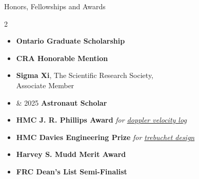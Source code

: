 \documentclass[]{mcdowellcv}
\begin{document}
\begin{cvsection}{Honors, Fellowships and Awards}
	\begin{cvsubsection}{}{}{}
		\vspace*{-1em}
		\begin{multicols}{2}
			\begin{itemize}
				\item[2026] \textbf{Ontario Graduate Scholarship}
				\item[2026] \textbf{CRA Honorable Mention}
				\item[2026] \textbf{Sigma Xi}, The Scientific Research Society,\\ Associate Member
				\item[2024] \hspace{-0.5em} \& 2025 \textbf{Astronaut Scholar}
				\item[2024] \textbf{HMC J. R. Phillips Award} \textit{for \hyperlink{doppler_velocity_log}{doppler velocity log}}
				\item[2023] \textbf{HMC Davies Engineering Prize} \textit{for \hyperlink{trebuchet_design}{trebuchet design}}
				\item[2022] \textbf{Harvey S. Mudd Merit Award}
				\item[2020] \textbf{FRC Dean's List Semi-Finalist}
			\end{itemize}
		\end{multicols}
		\vspace*{-1em}
	\end{cvsubsection}
\end{cvsection}
\end{document}
